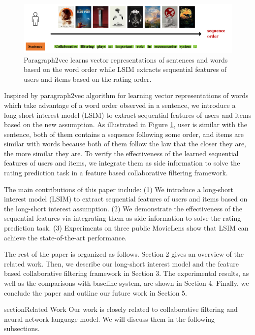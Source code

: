 \documentclass{llncs}
\begin{document}
\begin{figure}[htbp]
	\centering
	\includegraphics[scale=0.3]{images/example2.pdf}
	\caption{Paragraph2vec learns vector representations of sentences and words
		based on the word order
		while LSIM extracts sequential features of users and items
		based on the rating order.
	}
	\label{fig:example2}
\end{figure}

Inspired by paragraph2vec algorithm \cite{le2014distributed} for
learning vector representations of words which take advantage of
a word order observed in a sentence,
we introduce a long-short interest model (LSIM) to extract sequential features
of users and items based on the new assumption.
As illustrated in Figure \ref{fig:example2}, user is similar with the sentence,
both of them contains a sequence following some order,
and items are similar with words because both of them follow the law
that the closer they are, the more similar they are.
To verify the effectiveness of the learned sequential features of users
and items, we integrate them as side information to solve the rating prediction task
in a feature based collaborative filtering framework.

The main contributions of this paper include:
(1) We introduce a long-short interest model (LSIM) to extract sequential features
of users and items based on the long-short interest assumption.
(2) We demonstrate the effectiveness of the sequential features
via integrating them as side information to solve the rating prediction task.
(3) Experiments on three public MovieLens show that LSIM can achieve the state-of-the-art performance.

The rest of the paper is organized as follows. Section 2 gives an overview of the related work.
Then, we describe our long-short interest model and the feature based collaborative filtering
framework in Section 3. The experimental results, as well as the comparisons with
baseline system, are shown in Section 4.
Finally, we conclude the paper and outline our future work in Section 5.

section{Related Work}
Our work is closely related to collaborative filtering and
neural network language model.
We will discuss them in the following subsections.
\end{document}
